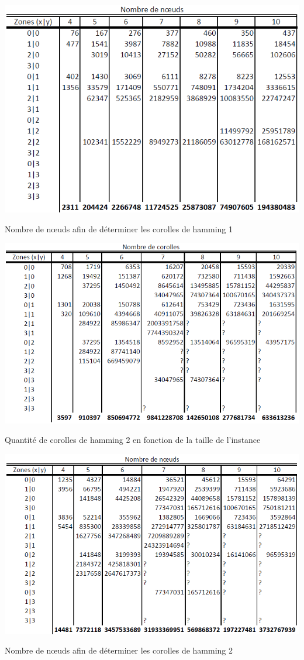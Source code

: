 \begin{appendices}
		\begin{table}[H]
			\centering
			\includegraphics[width=0.8\linewidth]{images/resultats_corolle_hamming_1_noeuds}
			\caption{Nombre de n\oe uds afin de déterminer les corolles de hamming 1}
		\end{table}

		\begin{table}[H]
			\centering
			\includegraphics[width=0.8\linewidth]{images/resultats_corolle_hamming_2}
			\caption{Quantité de corolles de hamming 2 en fonction de la taille de l'instance}\label{table:count_hamming_2}
		\end{table}
		\begin{table}[H]
			\centering
			\includegraphics[width=0.8\linewidth]{images/resultats_corolle_hamming_2_noeuds}
			\caption{Nombre de n\oe uds afin de déterminer les corolles de hamming 2}
		\end{table}


\end{appendices}
